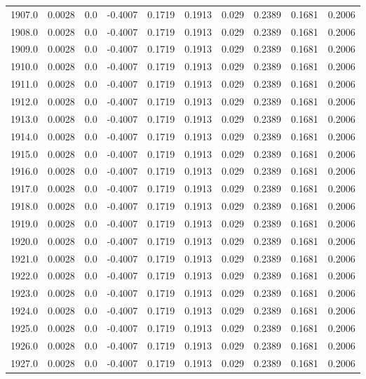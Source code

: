 \begin{longtable}{lrrrrrrrrr}
1907.0 & 0.0028 & 0.0 & -0.4007 & 0.1719 & 0.1913 & 0.029 & 0.2389 & 0.1681 & 0.2006 \\
1908.0 & 0.0028 & 0.0 & -0.4007 & 0.1719 & 0.1913 & 0.029 & 0.2389 & 0.1681 & 0.2006 \\
1909.0 & 0.0028 & 0.0 & -0.4007 & 0.1719 & 0.1913 & 0.029 & 0.2389 & 0.1681 & 0.2006 \\
1910.0 & 0.0028 & 0.0 & -0.4007 & 0.1719 & 0.1913 & 0.029 & 0.2389 & 0.1681 & 0.2006 \\
1911.0 & 0.0028 & 0.0 & -0.4007 & 0.1719 & 0.1913 & 0.029 & 0.2389 & 0.1681 & 0.2006 \\
1912.0 & 0.0028 & 0.0 & -0.4007 & 0.1719 & 0.1913 & 0.029 & 0.2389 & 0.1681 & 0.2006 \\
1913.0 & 0.0028 & 0.0 & -0.4007 & 0.1719 & 0.1913 & 0.029 & 0.2389 & 0.1681 & 0.2006 \\
1914.0 & 0.0028 & 0.0 & -0.4007 & 0.1719 & 0.1913 & 0.029 & 0.2389 & 0.1681 & 0.2006 \\
1915.0 & 0.0028 & 0.0 & -0.4007 & 0.1719 & 0.1913 & 0.029 & 0.2389 & 0.1681 & 0.2006 \\
1916.0 & 0.0028 & 0.0 & -0.4007 & 0.1719 & 0.1913 & 0.029 & 0.2389 & 0.1681 & 0.2006 \\
1917.0 & 0.0028 & 0.0 & -0.4007 & 0.1719 & 0.1913 & 0.029 & 0.2389 & 0.1681 & 0.2006 \\
1918.0 & 0.0028 & 0.0 & -0.4007 & 0.1719 & 0.1913 & 0.029 & 0.2389 & 0.1681 & 0.2006 \\
1919.0 & 0.0028 & 0.0 & -0.4007 & 0.1719 & 0.1913 & 0.029 & 0.2389 & 0.1681 & 0.2006 \\
1920.0 & 0.0028 & 0.0 & -0.4007 & 0.1719 & 0.1913 & 0.029 & 0.2389 & 0.1681 & 0.2006 \\
1921.0 & 0.0028 & 0.0 & -0.4007 & 0.1719 & 0.1913 & 0.029 & 0.2389 & 0.1681 & 0.2006 \\
1922.0 & 0.0028 & 0.0 & -0.4007 & 0.1719 & 0.1913 & 0.029 & 0.2389 & 0.1681 & 0.2006 \\
1923.0 & 0.0028 & 0.0 & -0.4007 & 0.1719 & 0.1913 & 0.029 & 0.2389 & 0.1681 & 0.2006 \\
1924.0 & 0.0028 & 0.0 & -0.4007 & 0.1719 & 0.1913 & 0.029 & 0.2389 & 0.1681 & 0.2006 \\
1925.0 & 0.0028 & 0.0 & -0.4007 & 0.1719 & 0.1913 & 0.029 & 0.2389 & 0.1681 & 0.2006 \\
1926.0 & 0.0028 & 0.0 & -0.4007 & 0.1719 & 0.1913 & 0.029 & 0.2389 & 0.1681 & 0.2006 \\
1927.0 & 0.0028 & 0.0 & -0.4007 & 0.1719 & 0.1913 & 0.029 & 0.2389 & 0.1681 & 0.2006 \\

\end{longtable}
